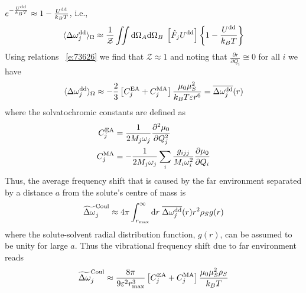 \documentclass[a4paper,titlepage,twoside,fleqn,12pt]{book}
\newcommand{\fderiv}[2]{\ensuremath{
    \frac{\partial #1}{\partial #2}}}
\newcommand{\sderiv}[2]{\ensuremath{
    \frac{\partial^2 #1}{\partial #2^2}
    }}
\begin{document}
\begin{refsection}
$e^{-\frac{U^{\rm dd}}{k_BT}}\approx 1 -\frac{U^{\rm dd}}{k_BT}$, i.e.,
%
\begin{equation}
 \langle \Delta \omega_j^{\rm dd} \rangle_{\Omega} \approx 
\frac{1}{\mathcal{Z}} 
\iint {\rm d}\Omega_A{\rm d}\Omega_B \; \left[\hat{F}_j U^{\rm dd}\right]
\left\{ 1 - \frac{U^{\rm dd}}{k_BT}\right\}
\end{equation}
%
Using relations ~\eqref{e:73626} we find that $\mathcal{Z}\approx1$
and noting that $\fderiv{r}{Q_i} \cong 0$ for all $i$ we have
%
\begin{equation}
 \langle \Delta \omega_j^{\rm dd} \rangle_{\Omega} \approx 
-\frac{2}{3} \left[ C^{\rm EA}_j + C^{\rm MA}_j \right] \frac{\mu_0\mu_S^2}{k_BT\varepsilon r^6} 
= \overline{\Delta \omega_j^{\rm dd}}(r)
\end{equation}
%
where the solvatochromic constants are defined as
%
\begin{subequations}
\begin{align}
 C^{\rm EA}_j &= \frac{1}{2M_j\omega_j} \sderiv{\mu_0}{Q_j} \\
 C^{\rm MA}_j &=-\frac{1}{2M_j\omega_j} \sum_i \frac{g_{ijj}}{M_i\omega_i^2} \fderiv{\mu_0}{Q_i}
\end{align}
\end{subequations}
%
Thus, the average frequency shift that is caused
by the far environment separated by a distance $a$
from the solute's centre of mass is
%
\begin{equation}
\widetilde{\Delta \omega}_j^{\rm Coul} \approx
4\pi \int_{r_{\rm max}}^{\infty} {\rm d}r \; \overline{\Delta \omega_j^{\rm dd}}(r) r^2 \rho_S g(r)
\end{equation}
%
where the solute\hyp{}solvent radial distribution function, $g(r)$, 
can be assumed to be unity for large $a$. Thus the vibrational
frequency shift due to far environment reads
%
\begin{equation} \label{e:x123}
  \widetilde{\Delta \omega}_j^{\rm Coul}  \approx 
\frac{8\pi}{9\varepsilon^2 r_{\rm max}^3} \left[ C^{\rm EA}_j + C^{\rm MA}_j \right] \frac{\mu_0\mu_S^2\rho_S}{k_BT} 
\end{equation}
%
%

\end{refsection}
\end{document}
